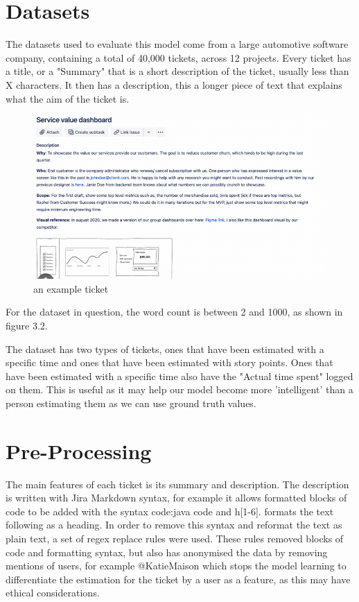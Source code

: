 \documentclass{UoYCSproject}
\begin{document}
\section{Datasets}\label{sec:datasets}
The datasets used to evaluate this model come from a large automotive software company, containing a total of 40,000 tickets, across 12 projects.
Every ticket has a title, or a "Summary" that is a short description of the ticket, usually less than X characters.
It then has a description, this a longer piece of text that explains what the aim of the ticket is. \par

\begin{figure}[h]
\includegraphics[width=\textwidth]{ticket-example}
\caption{an example ticket}
\label{fig:figure}
\end{figure}

For the dataset in question, the word count is between 2 and 1000, as shown in figure 3.2.


The dataset has two types of tickets, ones that have been estimated with a specific time and ones that have been estimated with story points.
Ones that have been estimated with a specific time also have the "Actual time spent" logged on them.
This is useful as it may help our model become more 'intelligent' than a person estimating them as we can use ground truth values. \par




\section{Pre-Processing}\label{sec:preprocessing}

    The main features of each ticket is its summary and description.
The description is written with Jira Markdown syntax, for example it allows formatted blocks of code to be added with the syntax {code:java} {code} and h[1-6]. formats the text following as a heading.
In order to remove this syntax and reformat the text as plain text, a set of regex replace rules were used.
These rules removed blocks of code and formatting syntax, but also has anonymised the data by removing mentions of users, for example @KatieMaison which stops the model learning to differentiate the estimation for the ticket by a user as a feature, as this may have ethical considerations. \par
\end{document}
